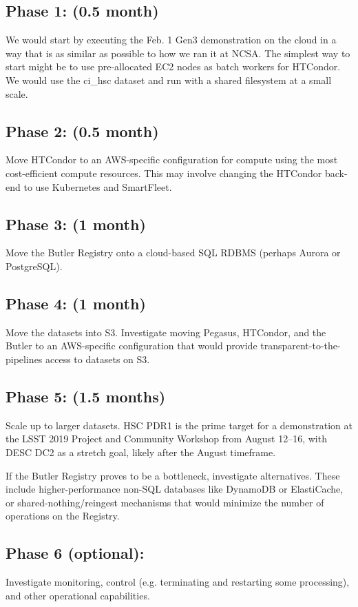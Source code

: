 \subsection{Phase 1: (0.5 month)} \label{sec:phase-1}
We would start by executing the Feb. 1 Gen3 demonstration on the cloud in a way that is as similar as possible to how we ran it at NCSA. The simplest way to start might be to use pre-allocated EC2 nodes as batch workers for HTCondor. We would use the ci\_hsc dataset and run with a shared filesystem at a small scale.

\subsection{Phase 2: (0.5 month)} \label{sec:phase-2}
Move HTCondor to an AWS-specific configuration for compute using the most cost-efficient compute resources. This may involve changing the HTCondor back-end to use Kubernetes and SmartFleet.

\subsection{Phase 3: (1 month)} \label{sec:phase-3}
Move the Butler Registry onto a cloud-based SQL RDBMS (perhaps Aurora or PostgreSQL).

\subsection{Phase 4: (1 month)} \label{sec:phase-4}
Move the datasets into S3. Investigate moving Pegasus, HTCondor, and the Butler to an AWS-specific configuration that would provide transparent-to-the-pipelines access to datasets on S3.

\subsection{Phase 5: (1.5 months)} \label{sec:phase-5}
Scale up to larger datasets. HSC PDR1 is the prime target for a demonstration at the LSST 2019 Project and Community Workshop from August 12–16, with DESC DC2 as a stretch goal, likely after the August timeframe.

If the Butler Registry proves to be a bottleneck, investigate alternatives. These include higher-performance non-SQL databases like DynamoDB or ElastiCache, or shared-nothing/reingest mechanisms that would minimize the number of operations on the Registry.

\subsection{Phase 6 (optional):} \label{sec:phase-6}
Investigate monitoring, control (e.g. terminating and restarting some processing), and other operational capabilities.

